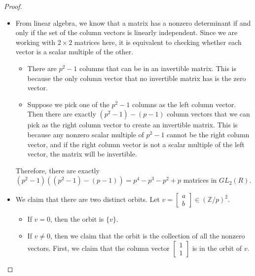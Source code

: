 \documentclass[12pt, psamsfonts]{amsart}
\theoremstyle{definition}
\theoremstyle{remark}
\numberwithin{equation}{section}
\begin{document}
\begin{proof}
  $ $
  \begin{itemize}
    \item
      From linear algebra, we know that a matrix has a nonzero determinant if and only if the set of the column vectors is linearly independent.
      Since we are working with $2 \times 2$ matrices here, it is equivalent to checking whether each vector is a scalar multiple of the other.
      \begin{itemize}
        \item
          There are $p^2 - 1$ columns that can be in an invertible matrix.
          This is because the only column vector that no invertible matrix has is the zero vector.
        \item
          Suppose we pick one of the $p^2 - 1$ columns as the left column vector.
          Then there are exactly $(p^2 - 1) - (p - 1)$ column vectors that we can pick as the right column vector to create an invertible matrix.
          This is because any nonzero scalar multiple of $p^2 - 1$ cannot be the right column vector, and if the right column vector is not a scalar multiple of the left vector, the matrix will be invertible.
      \end{itemize}
      Therefore, there are exactly $(p^2 - 1)((p^2 - 1) - (p - 1)) = p^4 - p^3 - p^2 + p$ matrices in $GL_2(R)$.
    \item
      We claim that there are two distinct orbits.
      Let $v = \begin{bmatrix} a \\ b \end{bmatrix} \in (\mathbb{Z}/p)^2$.
      \begin{itemize}
        \item
          If $v = 0$, then the orbit is $\{ v \}$.
        \item
          If $v \ne 0$, then we claim that the orbit is the collection of all the nonzero vectors.
          First, we claim that the column vector $\begin{bmatrix} 1 \\ 1 \end{bmatrix}$ is in the orbit of $v$.


\end{itemize}
\end{itemize}
\end{proof}
\end{document}
